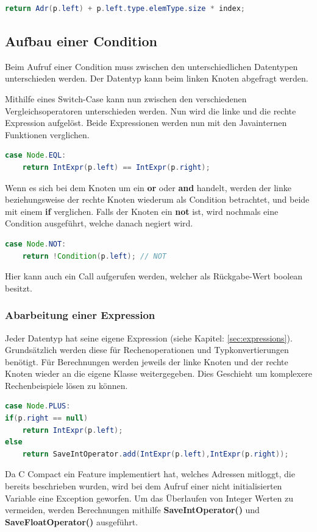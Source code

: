 \begin{lstlisting}[language=JAVA]
return Adr(p.left) + p.left.type.elemType.size * index;
\end{lstlisting}

\subsection{Aufbau einer Condition}
Beim Aufruf einer Condition muss zwischen den unterschiedlichen Datentypen unterschieden werden. Der Datentyp kann beim linken Knoten abgefragt werden.

Mithilfe eines Switch-Case kann nun zwischen den verschiedenen Vergleichsoperatoren unterschieden werden. Nun wird die linke und die rechte Expression aufgelöst. Beide Expressionen werden nun mit den Javainternen Funktionen verglichen. 
\begin{lstlisting}[language=JAVA]
case Node.EQL:
	return IntExpr(p.left) == IntExpr(p.right);
\end{lstlisting}

Wenn es sich bei dem Knoten um ein \textbf{or} oder \textbf{and} handelt, werden der linke beziehungsweise der rechte Knoten wiederum als Condition betrachtet, und beide mit einem \textbf{if} verglichen. Falls der Knoten ein \textbf{not} ist, wird nochmals eine Condition ausgeführt, welche danach negiert wird.
\begin{lstlisting}[language=JAVA]
case Node.NOT:
	return !Condition(p.left); // NOT
\end{lstlisting}

Hier kann auch ein Call aufgerufen werden, welcher als Rückgabe-Wert boolean besitzt.

\subsubsection{Abarbeitung einer Expression}
Jeder Datentyp hat seine eigene Expression (siehe Kapitel: \ref{sec:expressions}). Grundsätzlich werden diese für Rechenoperationen und Typkonvertierungen benötigt. Für Berechnungen werden jeweils der linke Knoten und der rechte Knoten wieder an die eigene Klasse weitergegeben. Dies Geschieht um komplexere Rechenbeispiele lösen zu können. 
\begin{lstlisting}[language=JAVA]
case Node.PLUS:
if(p.right == null)
	return IntExpr(p.left);
else
	return SaveIntOperator.add(IntExpr(p.left),IntExpr(p.right));
\end{lstlisting}

Da C Compact ein Feature implementiert hat, welches Adressen mitloggt, die bereits beschrieben wurden, wird bei dem Aufruf einer nicht initialisierten Variable eine Exception geworfen. Um das Überlaufen von Integer Werten zu vermeiden, werden Berechnungen mithilfe \textbf{SaveIntOperator()} und \textbf{SaveFloatOperator()} ausgeführt.

